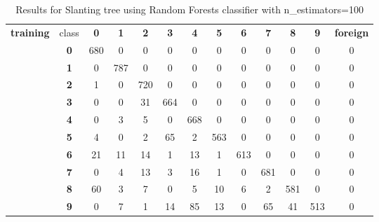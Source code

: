\begin{table}[htp]
	\centering
	\caption{Results for Slanting tree using Random Forests classifier with n\_estimators=100}
	\label{slanting_tree_rf_results}
	\begin{tabular}{|c|c|c|c|c|c|c|c|c|c|c|c|c|}
		\hline
		\multirow{11}{*}{\textbf{training}} & class      & \textbf{0} & \textbf{1} & \textbf{2} & \textbf{3} & \textbf{4} & \textbf{5} & \textbf{6} & \textbf{7} & \textbf{8} & \textbf{9} & \textbf{foreign} \\ \cline{2-13} 
		& \textbf{0} & 680        & 0          & 0          & 0          & 0          & 0          & 0          & 0          & 0          & 0          & 0                \\ \cline{2-13} 
		& \textbf{1} & 0          & 787        & 0          & 0          & 0          & 0          & 0          & 0          & 0          & 0          & 0                \\ \cline{2-13} 
		& \textbf{2} & 1          & 0          & 720        & 0          & 0          & 0          & 0          & 0          & 0          & 0          & 0                \\ \cline{2-13} 
		& \textbf{3} & 0          & 0          & 31         & 664        & 0          & 0          & 0          & 0          & 0          & 0          & 0                \\ \cline{2-13} 
		& \textbf{4} & 0          & 3          & 5          & 0          & 668        & 0          & 0          & 0          & 0          & 0          & 0                \\ \cline{2-13} 
		& \textbf{5} & 4          & 0          & 2          & 65         & 2          & 563        & 0          & 0          & 0          & 0          & 0                \\ \cline{2-13} 
		& \textbf{6} & 21         & 11         & 14         & 1          & 13         & 1          & 613        & 0          & 0          & 0          & 0                \\ \cline{2-13} 
		& \textbf{7} & 0          & 4          & 13         & 3          & 16         & 1          & 0          & 681        & 0          & 0          & 0                \\ \cline{2-13} 
		& \textbf{8} & 60         & 3          & 7          & 0          & 5          & 10         & 6          & 2          & 581        & 0          & 0                \\ \cline{2-13} 
		& \textbf{9} & 0          & 7          & 1          & 14         & 85         & 13         & 0          & 65         & 41         & 513        & 0                \\ \hline

\end{tabular}
\end{table}
